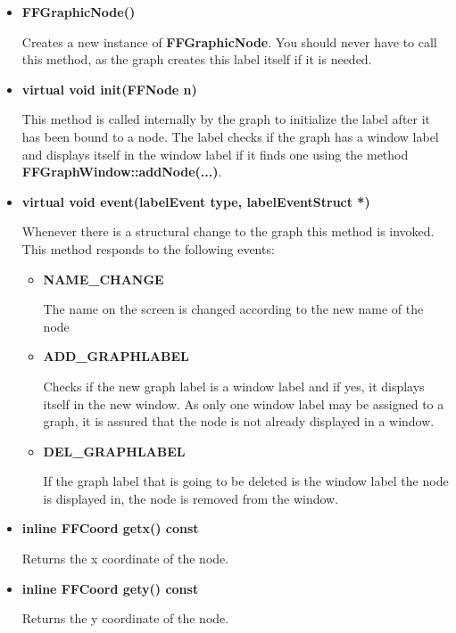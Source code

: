 \begin{itemize}

\item{\bf FFGraphicNode()}
  
  Creates a new instance of {\bf FFGraphicNode}. You should never
  have to call this method, as the graph creates this label
  itself if it is needed.

\item{\bf virtual void init(FFNode n)}
  
  This method is called internally by the graph to initialize
  the label after it has been bound to a node. The label checks
  if the graph has a window label and displays itself in the
  window label if it finds one using the method {\bf
    FFGraphWindow::addNode(...)}.

\item{\bf virtual void event(labelEvent type, labelEventStruct *)}
  
  Whenever there is a structural change to the graph this method
  is invoked. This method responds to the following events:

  \begin{itemize}

  \item{\bf NAME\_CHANGE}
    
    The name on the screen is changed according to the new name
    of the node

  \item{\bf ADD\_GRAPHLABEL}
    
    Checks if the new graph label is a window label and if yes,
    it displays itself in the new window. As only one window
    label may be assigned to a graph, it is assured that the node
    is not already displayed in a window.

  \item{\bf DEL\_GRAPHLABEL}
    
    If the graph label that is going to be deleted is the window
    label the node is displayed in, the node is removed from the
    window.

  \end{itemize}

\item{\bf inline FFCoord getx() const}

  Returns the x coordinate of the node.

\item{\bf inline FFCoord gety() const}

  Returns the y coordinate of the node.


\end{itemize}
